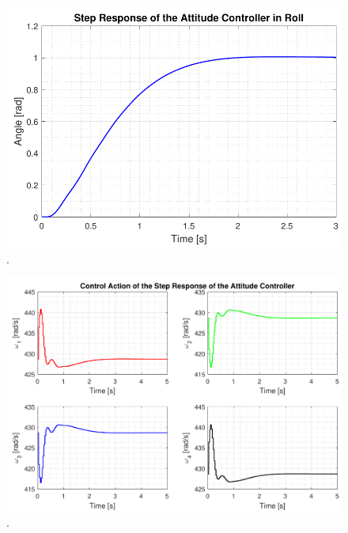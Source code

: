 \begin{figure}[H]
	\centering
	\includegraphics[scale=0.8]{figures/ssFinalStep.pdf}
	\caption{.}
	\label{fig:TranslationalControlDiagram}
\end{figure}

\begin{figure}[H]
	\centering
	\includegraphics[scale=0.8]{figures/ssFinalStepAction.pdf}
	\caption{.}
	\label{fig:TranslationalControlDiagram}
\end{figure}